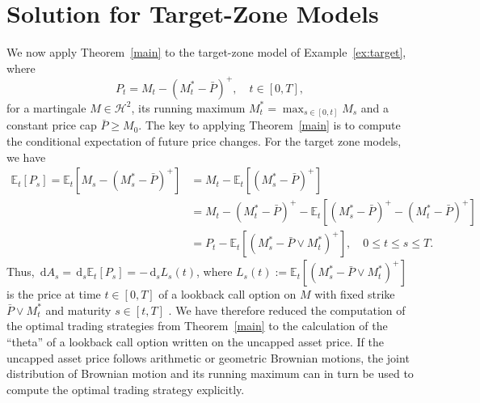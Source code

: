 \documentclass[11pt]{article}
\numberwithin{equation}{section}
\theoremstyle{definition}
\theoremstyle{remark}
\newcommand{\E}{\mathbb{E}} %
\newcommand{\de}{\,\mathrm{d}}
\begin{document}
\section{Solution for Target-Zone Models}\label{s:cap}

We now apply Theorem~\ref{main} to the target-zone model of Example~\ref{ex:target}, where
$$
P_t=M_t -(M^*_t-\bar{P})^+, \quad t \in [0,T],
$$
for a martingale $M\in\mathcal{H}^2$, its running maximum $M^*_t=\max_{s \in [0,t]}M_s$ and a constant price cap $\bar{P} \geq M_0$. The key to applying Theorem~\ref{main} is to compute the conditional expectation of future price changes. For the target zone models, we have
\begin{align*}
\E_t[P_s] = \E_t\left[M_s-(M^*_s-\bar{P})^+\right] &= M_t-\E_t\left[(M^*_s-\bar{P})^+\right]\\
& =M_t-(M^*_t-\bar{P})^+ - \E_t\left[(M^*_s-\bar{P})^+ - (M^*_t-\bar{P})^+\right]\\
&=P_t - \E_t\left[(M^*_s-\bar{P}\vee M^*_t)^+\right], \quad 0 \leq t \leq s \leq T.
\end{align*}
Thus, $\de A_s=\de_s \E_t[P_s] = -\de_s L_s(t)$, where $L_s(t):=\E_t[(M^*_s-\bar{P}\vee M^*_t)^+]$ is the price at time $t \in [0,T]$ of a lookback call option on $M$ with fixed strike $\bar{P}\vee M^*_t$ and maturity $s \in [t,T]$ . We have therefore reduced the computation of the optimal trading strategies from Theorem~\ref{main} to the calculation of the ``theta'' of a lookback call option written on the uncapped asset price. If the uncapped asset price follows arithmetic or geometric Brownian motions, the joint distribution of Brownian motion and its running maximum can in turn be used to compute the optimal trading strategy explicitly.
\end{document}
